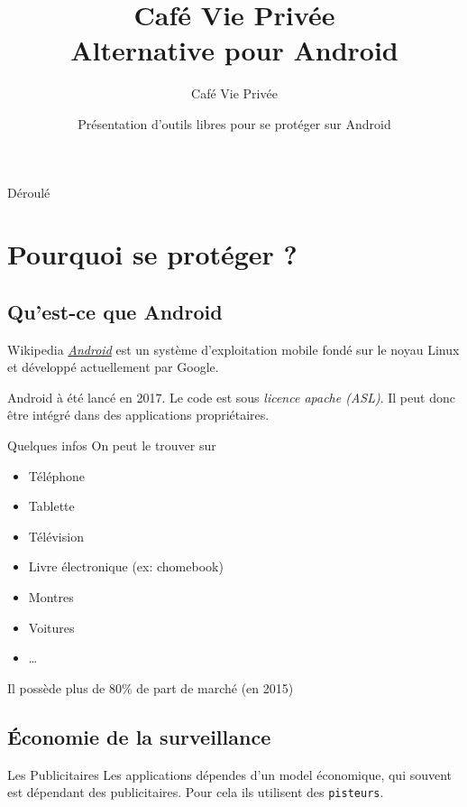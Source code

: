 \documentclass[compress]{beamer}
\title[U-Boot]{Café Vie Privée \\ \textbf{Alternative pour Android}}
\author[Café Vie Privée]{Café Vie Privée}
\date[Août 2018]{Présentation d'outils libres pour se protéger sur Android}
\begin{document}

\begin{frame}
\titlepage
\end{frame}



\begin{frame}{Déroulé}
\tableofcontents[hideallsubsections]
\end{frame}

\section{Pourquoi se protéger ?}

\subsection{Qu'est-ce que Android}

\begin{frame}{}
\begin{block}{Wikipedia}
	\emph{\href{https://fr.wikipedia.org/wiki/Android}{Android}} est un système d'exploitation mobile fondé sur le noyau Linux et développé actuellement par Google.
\end{block}
Android à été lancé en 2017.\newline
Le code est sous \emph{licence apache (ASL)}. Il peut donc être intégré dans des applications propriétaires.
\end{frame}

\begin{frame}{Quelques infos}
On peut le trouver sur
\begin{itemize}
	\item Téléphone
	\item Tablette
	\item Télévision
	\item Livre électronique (ex: chomebook)
	\item Montres
	\item Voitures
	\item …
\end{itemize}
Il possède plus de 80\% de part de marché (en 2015) 
\end{frame}

\subsection{Économie de la surveillance}
\begin{frame}{Les Publicitaires}
Les applications dépendes d'un model économique, qui souvent est dépendant des publicitaires.\newline
\newline
Pour cela ils utilisent des \texttt{pisteurs}.
\end{frame}
\end{document}
